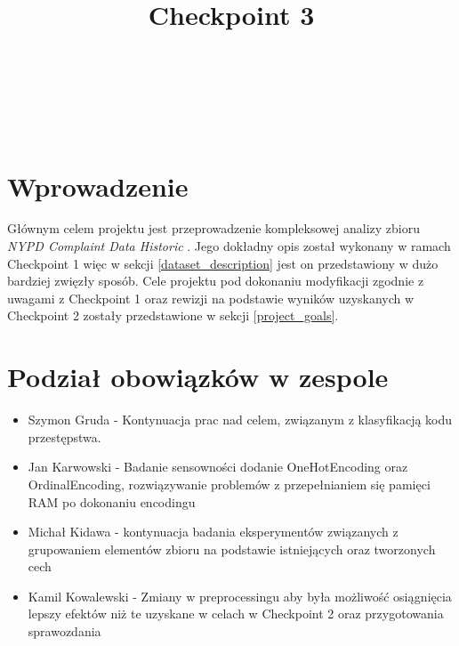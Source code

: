 \documentclass{classrep}
\author{%
    \studentinfo[239661@edu.p.lodz.pl]{Szymon Gruda}{239661}\\
    \studentinfo[239671@edu.p.lodz.pl]{Jan Karwowski}{239671}\\
    \studentinfo[239673@edu.p.lodz.pl]{Michał Kidawa}{239673}\\
    \studentinfo[239676@edu.p.lodz.pl]{Kamil Kowalewski}{239676}\\
}
\title{Checkpoint 3}
\begin{document}
    \maketitle
    \thispagestyle{fancyplain}

    \tableofcontents
    \newpage

    \section{Wprowadzenie} \label{intro} {
        Głównym celem projektu jest przeprowadzenie kompleksowej analizy zbioru
        \textit{NYPD Complaint Data Historic} \cite{nypd_dataset}. Jego dokładny opis
        został wykonany w ramach Checkpoint 1 więc w sekcji \ref{dataset_description}
        jest on przedstawiony w dużo bardziej zwięzły sposób. Cele projektu pod
        dokonaniu modyfikacji zgodnie z uwagami z Checkpoint 1 oraz rewizji na
        podstawie wyników uzyskanych w Checkpoint 2 zostały przedstawione w sekcji
        \ref{project_goals}.
    }

    \section{Podział obowiązków w zespole} {
        \begin{itemize}
            \item Szymon Gruda - Kontynuacja prac nad celem, związanym z klasyfikacją kodu przestępstwa.
            \item Jan Karwowski - Badanie sensowności dodanie OneHotEncoding oraz OrdinalEncoding, rozwiązywanie problemów z przepełnianiem się pamięci RAM po dokonaniu encodingu
            \item Michał Kidawa - kontynuacja badania eksperymentów związanych z grupowaniem elementów zbioru na podstawie istniejących oraz tworzonych cech
            \item Kamil Kowalewski - Zmiany w preprocessingu aby była możliwość osiągnięcia lepszy efektów niż te uzyskane w celach w Checkpoint 2 oraz przygotowania sprawozdania
        \end{itemize}
    }
\end{document}
